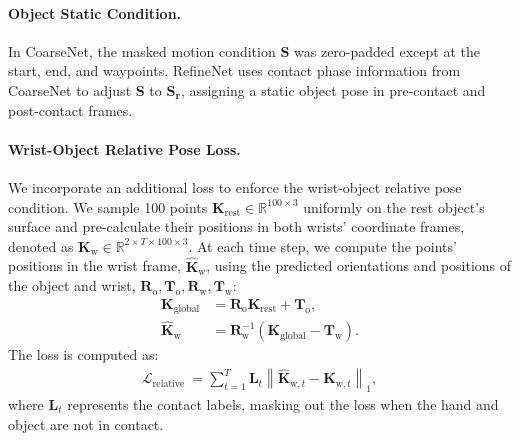 \paragraph{Object Static Condition.}
In CoarseNet, the masked motion condition $\bm{S}$ was zero-padded except at the start, end, and waypoints. RefineNet uses contact phase information from CoarseNet to adjust $\bm{S}$ to $\bm{S_{r}}$, assigning a static object pose in pre-contact and post-contact frames.


\vspace{-2mm}
\paragraph{Wrist-Object Relative Pose Loss.}
We incorporate an additional loss to enforce the wrist-object relative pose condition. We sample 100 points $\bm{K}_{\text{rest}} \in \mathbb{R}^{100 \times 3}$ uniformly on the rest object’s surface and pre-calculate their positions in both wrists' coordinate frames, denoted as $\bm{K}_{\text{w}} \in \mathbb{R}^{2\times T \times 100 \times 3}$. 
At each time step, we compute the points' positions in the wrist frame, $\hat{\bm{K}}_{\text{w}}$, using the predicted orientations and positions of the object and wrist, $\bm{R}_{\text{o}}, \bm{T}_{\text{o}}, \bm{R}_{\text{w}}, \bm{T}_{\text{w}}$:
\begin{align}
\bm{K}_{\text{global}} &= \bm{R}_{\text{o}}\bm{K}_{\text{rest}} + \bm{T}_{\text{o}}, \\
\hat{\bm{K}}_{\text{w}} &= \bm{R}_{\text{w}}^{-1} \left( \bm{K}_{\text{global}} - \bm{T}_{\text{w}}\right).
\end{align}
The loss is computed as:
\begin{align}
\mathcal{L}_{\text{relative }}=
\sum_{t=1}^T
\bm{L}_{t}
\left\| 
\hat{\bm{K}}_{\text{w}, t}-\bm{K}_{\text{w}, t}
\right\|_1,
\end{align}
where $\bm{L}_{t}$ represents the contact labels, masking out the loss when the hand and object are not in contact.


